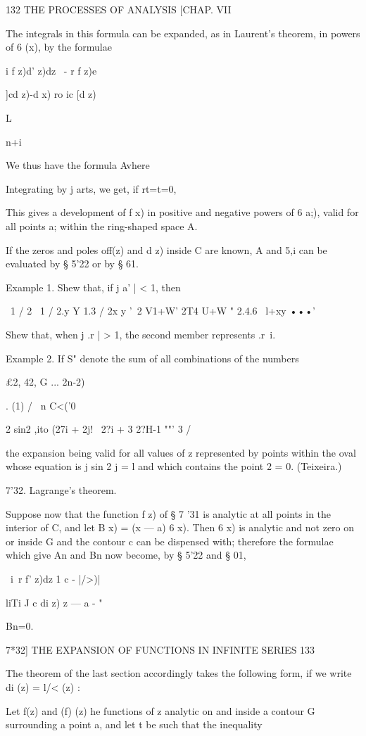 132 THE PROCESSES OF ANALYSIS [CHAP. VII

The integrals in this formula can be expanded, as in Laurent's
theorem, in powers of 6 (x), by the formulae

i f z)d' z)dz \ - r f z)e

]cd z)-d x) ro ic [d z)\

L

n+i

We thus have the formula Avhere

Integrating by j arts, we get, if rt=t=0,

This gives a development of f x) in positive and negative powers of 6
a;), valid for all points a; within the ring-shaped space A.

If the zeros and poles off(z) and d z) inside C are known, A and 5,i
can be evaluated by § 5'22 or by § 61.

Example 1. Shew that, if j a' | < 1, then

\ 1 / 2 \ 1 / 2.y Y 1.3 / 2x y '~2 V1+W' 2T4 U+W " 2.4.6 \ l+xy •••'

Shew that, when j .r | > 1, the second member represents .r~i.

Example 2. If S" denote the sum of all combinations of the numbers

£2, 42, G ... 2n-2)%

. (1) / \ n C<('0

2 sin2 ,ito (27i + 2j! \ 2?i + 3 2?H-1 ""' 3 /

the expansion being valid for all values of z represented by points
within the oval whose equation is j sin 2 j = l and which contains the
point 2 = 0. (Teixeira.)

7'32. Lagrange's theorem.

Suppose now that the function f z) of § 7 '31 is analytic at all
points in the interior of C, and let B x) = (x — a) 6 x). Then 6 x) is
analytic and not zero on or inside G and the contour c can be
dispensed with; therefore the formulae which give An and Bn now
become, by § 5'22 and § 01,

\ i\ r f' z)dz 1 c - |/>)|

liTi J c di z) z — a - "

Bn=0.

7*32] THE EXPANSION OF FUNCTIONS IN INFINITE SERIES 133

The theorem of the last section accordingly takes the following form,
if we write di (z) = l/< (z) :

Let f(z) and (f) (z) he functions of z analytic on and inside a
contour G surrounding a point a, and let t be such that the inequality

